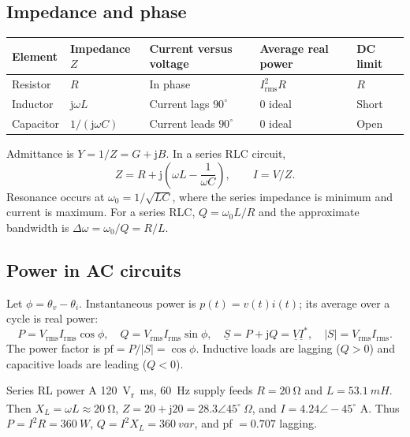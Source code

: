 \documentclass[10pt]{article}
\newcommand{\jj}{\mathrm{j}}
\newcommand{\rms}{\mathrm{rms}}
\newcommand{\phasor}[1]{\underline{#1}}
\newcommand{\abs}[1]{\left|#1\right|}
\begin{document}
\subsection{Impedance and phase}
\begin{center}
\begin{tabular}{lllll}
\toprule
Element & Impedance $Z$ & Current versus voltage & Average real power & DC limit \\
\midrule
Resistor & $R$ & In phase & $I_{\rms}^2R$ & $R$ \\
Inductor & $\jj\omega L$ & Current lags $90^\circ$ & 0 ideal & Short \\
Capacitor & $1/(\jj\omega C)$ & Current leads $90^\circ$ & 0 ideal & Open \\
\bottomrule
\end{tabular}
\end{center}
Admittance is $Y=1/Z=G+\jj B$. In a series RLC circuit,
\begin{equation}
 Z=R+\jj\left(\omega L-\frac1{\omega C}\right),\qquad I=V/Z.
\end{equation}
Resonance occurs at $\omega_0=1/\sqrt{LC}$, where the series impedance is
minimum and current is maximum. For a series RLC, $Q=\omega_0L/R$ and the
approximate bandwidth is $\Delta\omega=\omega_0/Q=R/L$.

\subsection{Power in AC circuits}
Let $\phi=\theta_v-\theta_i$. Instantaneous power is $p(t)=v(t)i(t)$;
its average over a cycle is real power:
\begin{equation}
 P=V_{\rms}I_{\rms}\cos\phi,\quad Q=V_{\rms}I_{\rms}\sin\phi,\quad
 \phasor S=P+\jj Q=\phasor V\phasor I^*,\quad \abs S=V_{\rms}I_{\rms}.
\end{equation}
The power factor is $\mathrm{pf}=P/\abs S=\cos\phi$. Inductive loads are
lagging ($Q>0$) and capacitive loads are leading ($Q<0$).

\begin{examplebox}{Series RL power}
A \SI{120}{V_rms}, \SI{60}{Hz} supply feeds $R=\SI{20}{\ohm}$ and
$L=\SI{53.1}{mH}$. Then $X_L=\omega L\approx\SI{20}{\ohm}$,
$Z=20+\jj20=28.3\angle45^\circ\ \Omega$, and $I=4.24\angle-45^\circ$ A.
Thus $P=I^2R=\SI{360}{W}$, $Q=I^2X_L=\SI{360}{var}$, and pf $=0.707$ lagging.
\end{examplebox}
\end{document}
